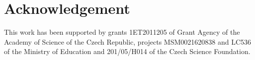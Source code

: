 \documentclass[11pt]{article}
\begin{document}

\section{Acknowledgement}

This work has been supported by grants 1ET2011205 of Grant Agency of the Academy of Science of the Czech Republic, projects MSM0021620838 and LC536 of the Ministry of Education and 201/05/H014 of the Czech Science Foundation.



%
\begin{small}

\end{small}
\end{document}
